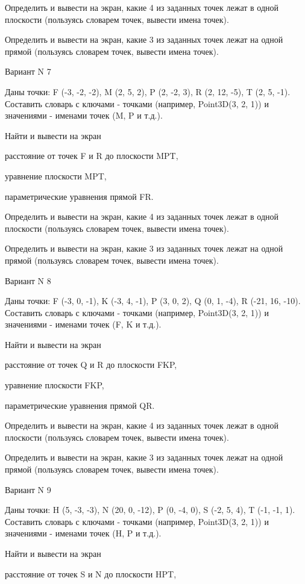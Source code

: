 \documentclass[11pt]{report}
\begin{document}
Определить и вывести на экран, какие 4 из заданных точек лежат в одной плоскости (пользуясь словарем точек, вывести имена точек).


Определить и вывести на экран, какие 3 из заданных точек лежат на одной прямой (пользуясь словарем точек, вывести имена точек).

Вариант N 7

Даны точки: F (-3, -2, -2), M (2, 5, 2), P (2, -2, 3), R (2, 12, -5), T (2, 5, -1).
Составить словарь с ключами - точками (например, Point3D(3, 2, 1)) и значениями - именами точек (M, P и т.д.).

 
Найти и вывести на экран


расстояние от точек F и R до плоскости MPT,

 
уравнение плоскости MPT,

 
параметрические уравнения прямой FR.


Определить и вывести на экран, какие 4 из заданных точек лежат в одной плоскости (пользуясь словарем точек, вывести имена точек).


Определить и вывести на экран, какие 3 из заданных точек лежат на одной прямой (пользуясь словарем точек, вывести имена точек).

Вариант N 8

Даны точки: F (-3, 0, -1), K (-3, 4, -1), P (3, 0, 2), Q (0, 1, -4), R (-21, 16, -10).
Составить словарь с ключами - точками (например, Point3D(3, 2, 1)) и значениями - именами точек (F, K и т.д.).

 
Найти и вывести на экран


расстояние от точек Q и R до плоскости FKP,

 
уравнение плоскости FKP,

 
параметрические уравнения прямой QR.


Определить и вывести на экран, какие 4 из заданных точек лежат в одной плоскости (пользуясь словарем точек, вывести имена точек).


Определить и вывести на экран, какие 3 из заданных точек лежат на одной прямой (пользуясь словарем точек, вывести имена точек).

Вариант N 9

Даны точки: H (5, -3, -3), N (20, 0, -12), P (0, -4, 0), S (-2, 5, 4), T (-1, -1, 1).
Составить словарь с ключами - точками (например, Point3D(3, 2, 1)) и значениями - именами точек (H, P и т.д.).

 
Найти и вывести на экран


расстояние от точек S и N до плоскости HPT,
\end{document}

